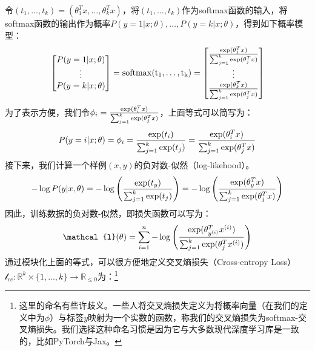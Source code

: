 \documentclass[letterpaper,11pt]{report}
\numberwithin{equation}{section}
\begin{document}
\begin{CJK}{UTF8}{gbsn}
  令$(t_1,\ldots,t_k)=(\theta_1^Tx,\ldots,\theta_k^Tx)$，将$(t_1,\ldots,t_k)$作为softmax函数的输入，将softmax函数的输出作为概率$P(y=1 | x;\theta),\ldots,P(y=k | x;\theta)$，得到如下概率模型：
  \begin{equation}
    \begin{bmatrix}
      P(y=1 | x;\theta) \\
      \vdots            \\
      P(y=k | x;\theta) \\
    \end{bmatrix}
    =
    \rm{softmax}(t_1,\ldots,t_k)
    =
    \begin{bmatrix}
      \frac{{\rm{exp}} (\theta_1^T x)}{\sum^k_{j=1}{\rm{exp}} (\theta_j^T x)} \\
      \vdots                                                                  \\
      \frac{{\rm{exp}} (\theta_k^T x)}{\sum^k_{j=1}{\rm{exp}} (\theta_j^T x)} \\
    \end{bmatrix}
  \end{equation}
  为了表示方便，我们令$\phi_i=\frac{{\rm{exp}} (\theta_i^T x)}{\sum^k_{j=1}{\rm{exp}} (\theta_j^T x)}$，上面等式可以简写为：
  \begin{equation}
    P(y=i|x;\theta) = \phi_i= \frac{{\rm{exp}} (t_i)}{\sum^k_{j=1}{\rm{exp}} (t_j)} = \frac{{\rm{exp}} (\theta_i^T x)}{\sum^k_{j=1}{\rm{exp}} (\theta_j^T x)}
  \end{equation}
  接下来，我们计算一个样例$(x,y)$的负对数-似然（log-likehood）。
  \begin{equation}
    -\log P(y|x,\theta)=-\log \left( \frac{{\rm{exp}} (t_y)}{\sum^k_{j=1}{\rm{exp}} (t_j)} \right) = -\log \left( \frac{{\rm{exp}} (\theta_y^T x)}{\sum^k_{j=1}{\rm{exp}} (\theta_j^T x)} \right)
  \end{equation}
  因此，训练数据的负对数-似然，即损失函数可以写为：
  \begin{equation} \label{multi-class-loss}
    \mathcal{l}(\theta) = \sum^n_{i=1} - \log \left( \frac{{\rm{exp}} (\theta_{y^{(i)}}^T x^{(i)})}{\sum^k_{j=1}{\rm{exp}} (\theta_j^T x^{(i)})} \right)
  \end{equation}
  通过模块化上面的等式，可以很方便地定义交叉熵损失（Cross-entropy Loss）$\mathcal{l}_{ce}:\mathbb{R}^k \times \{1,\ldots,k\} \rightarrow \mathbb{R}_{\leq 0}$为：\footnote{这里的命名有些许歧义。一些人将交叉熵损失定义为将概率向量（在我们的定义中为$\phi$）与标签$y$映射为一个实数的函数，称我们的交叉熵损失为softmax-交叉熵损失。我们选择这种命名习惯是因为它与大多数现代深度学习库是一致的，比如PyTorch与Jax。}

\end{CJK}
\end{document}
